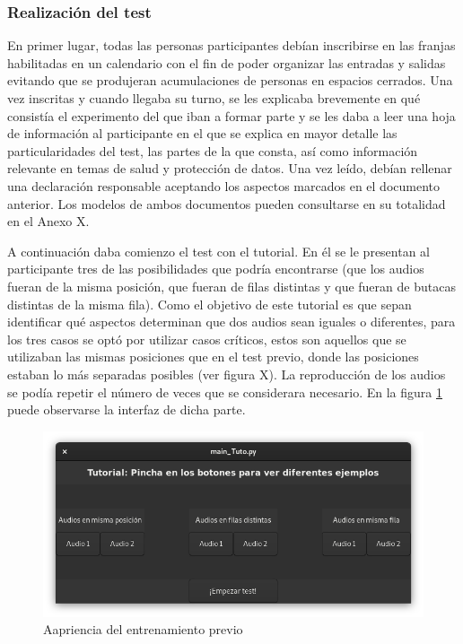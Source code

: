 \documentclass[11pt,a4paper,twoside]{book}
\begin{document}
                \subsubsection*{Realización del test}
                    En primer lugar, todas las personas participantes debían inscribirse en las franjas habilitadas en un calendario con el fin de poder organizar las entradas y salidas evitando que se produjeran acumulaciones de personas en espacios cerrados. Una vez inscritas y cuando llegaba su turno, se les explicaba brevemente en qué consistía el experimento del que iban a formar parte y se les daba a leer una hoja de información al participante en el que se explica en mayor detalle las particularidades del test, las partes de la que consta, así como información relevante en temas de salud y protección de datos. Una vez leído, debían rellenar una declaración responsable aceptando los aspectos marcados en el documento anterior. Los modelos de ambos documentos pueden consultarse en su totalidad en el Anexo X.
                
                    A continuación daba comienzo el test con el tutorial. En él se le presentan al participante tres de las posibilidades que podría encontrarse (que los audios fueran de la misma posición, que fueran de filas distintas y que fueran de butacas distintas de la misma fila). Como el objetivo de este tutorial es que sepan identificar qué aspectos determinan que dos audios sean iguales o diferentes, para los tres casos se optó por utilizar casos críticos, estos son aquellos que se utilizaban las mismas posiciones que en el test previo, donde las posiciones estaban lo más separadas posibles (ver figura X). La reproducción de los audios se podía repetir el número de veces que se considerara necesario. En la figura \ref{fig:interfazTutorial} puede observarse la interfaz de dicha parte.
                
                    \begin{figure}
                        \includegraphics[scale=0.6]{../imagenes/interfaz_tutorial.png}
			            \centering
			            \caption{Aapriencia del entrenamiento previo}
			            \label{fig:interfazTutorial}
                    \end{figure}
                
\end{document}
